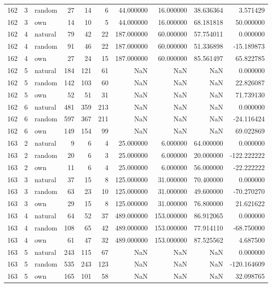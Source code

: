 \begin{table}[htbp]
\begin{tabular}{rrlrrrrrrr}
162 & 3 & random & 27 & 14 & 6 & 44.000000 & 16.000000 & 38.636364 & 3.571429 \\
162 & 3 & own & 14 & 10 & 5 & 44.000000 & 16.000000 & 68.181818 & 50.000000 \\
162 & 4 & natural & 79 & 42 & 22 & 187.000000 & 60.000000 & 57.754011 & 0.000000 \\
162 & 4 & random & 91 & 46 & 22 & 187.000000 & 60.000000 & 51.336898 & -15.189873 \\
162 & 4 & own & 27 & 24 & 15 & 187.000000 & 60.000000 & 85.561497 & 65.822785 \\
162 & 5 & natural & 184 & 121 & 61 & NaN & NaN & NaN & 0.000000 \\
162 & 5 & random & 142 & 103 & 60 & NaN & NaN & NaN & 22.826087 \\
162 & 5 & own & 52 & 51 & 31 & NaN & NaN & NaN & 71.739130 \\
162 & 6 & natural & 481 & 359 & 213 & NaN & NaN & NaN & 0.000000 \\
162 & 6 & random & 597 & 367 & 211 & NaN & NaN & NaN & -24.116424 \\
162 & 6 & own & 149 & 154 & 99 & NaN & NaN & NaN & 69.022869 \\
163 & 2 & natural & 9 & 6 & 4 & 25.000000 & 6.000000 & 64.000000 & 0.000000 \\
163 & 2 & random & 20 & 6 & 3 & 25.000000 & 6.000000 & 20.000000 & -122.222222 \\
163 & 2 & own & 11 & 6 & 4 & 25.000000 & 6.000000 & 56.000000 & -22.222222 \\
163 & 3 & natural & 37 & 15 & 8 & 125.000000 & 31.000000 & 70.400000 & 0.000000 \\
163 & 3 & random & 63 & 23 & 10 & 125.000000 & 31.000000 & 49.600000 & -70.270270 \\
163 & 3 & own & 29 & 15 & 8 & 125.000000 & 31.000000 & 76.800000 & 21.621622 \\
163 & 4 & natural & 64 & 52 & 37 & 489.000000 & 153.000000 & 86.912065 & 0.000000 \\
163 & 4 & random & 108 & 65 & 42 & 489.000000 & 153.000000 & 77.914110 & -68.750000 \\
163 & 4 & own & 61 & 47 & 32 & 489.000000 & 153.000000 & 87.525562 & 4.687500 \\
163 & 5 & natural & 243 & 115 & 67 & NaN & NaN & NaN & 0.000000 \\
163 & 5 & random & 535 & 243 & 123 & NaN & NaN & NaN & -120.164609 \\
163 & 5 & own & 165 & 101 & 58 & NaN & NaN & NaN & 32.098765 \\

\end{tabular}
\end{table}
